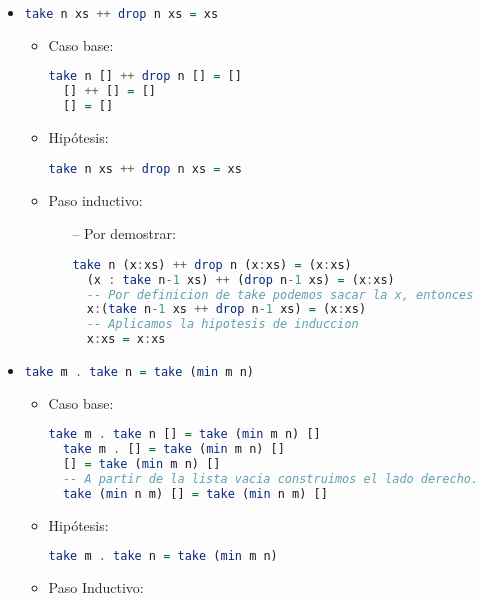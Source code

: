\documentclass[spanish,12pt,letterpaper]{article}
\begin{document}
\begin{itemize}
\item
  \begin{lstlisting}[language=Haskell]
  take n xs ++ drop n xs = xs \end{lstlisting}
	\begin{itemize}
	\item Caso base: \\
	\begin{lstlisting}[language=Haskell]
  take n [] ++ drop n [] = []
  [] ++ [] = []
  [] = [] \end{lstlisting}

	\item Hipótesis:
	\begin{lstlisting}[language=Haskell]
  take n xs ++ drop n xs = xs \end{lstlisting}

  	\item Paso inductivo:
  	\begin{itemize}
  		\item[--] Por demostrar:
	\begin{lstlisting}[language=Haskell]
  take n (x:xs) ++ drop n (x:xs) = (x:xs)
  (x : take n-1 xs) ++ (drop n-1 xs) = (x:xs)
  -- Por definicion de take podemos sacar la x, entonces
  x:(take n-1 xs ++ drop n-1 xs) = (x:xs)
  -- Aplicamos la hipotesis de induccion
  x:xs = x:xs  	\end{lstlisting}
  	\end{itemize}
	\end{itemize}

\item
  \begin{lstlisting}[language=Haskell]
  take m . take n = take (min m n)\end{lstlisting}
  \begin{itemize}
  \item Caso base:
  \begin{lstlisting}[language=Haskell]
  take m . take n [] = take (min m n) []
  take m . [] = take (min m n) []
  [] = take (min m n) []
  -- A partir de la lista vacia construimos el lado derecho.
  take (min n m) [] = take (min n m) []
  \end{lstlisting}
  \item Hipótesis:
  \begin{lstlisting}[language=Haskell]
  take m . take n = take (min m n)
  \end{lstlisting}
  \item Paso Inductivo:\\


\end{itemize}
\end{itemize}
\end{document}
